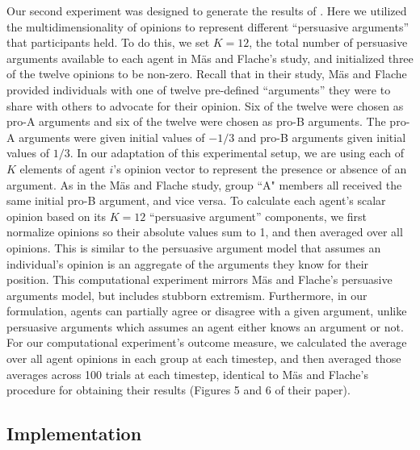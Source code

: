Our second experiment was designed to 
generate the results of . Here we utilized the multidimensionality of 
opinions to represent different ``persuasive arguments'' that participants held.
To do this, we set $K=12$, the total number of persuasive arguments available
to each agent in M\"{a}s and Flache's study, and initialized three of the twelve
opinions to be non-zero.  Recall that in their study, M\"{a}s and Flache provided
individuals with one of twelve pre-defined ``arguments'' they were to share with 
others to advocate for their opinion. Six of the twelve were chosen as pro-A arguments 
and six of the twelve were chosen as pro-B arguments. The pro-A arguments
were given initial values of $-1/3$ and pro-B arguments given initial
values of $1/3$. In our adaptation of this experimental setup, we are using
each of $K$ elements of agent $i$'s opinion vector to represent the presence
or absence of an argument. 
As in the M\"{a}s and Flache study, group ``A" members all received
the same initial pro-B argument, and vice versa. 
To calculate each agent's scalar opinion based on its $K=12$
``persuasive argument'' components, we first normalize opinions so their absolute
values sum to 1, and then averaged over all opinions. This is similar to the
persuasive argument model that assumes an individual's opinion is an aggregate
of the arguments they know for their position. 
This computational experiment mirrors M\"{a}s and Flache's persuasive arguments model, 
but includes stubborn extremism. Furthermore, in our formulation, agents can 
partially agree or disagree
with a given argument, unlike persuasive arguments which assumes an agent either
knows an argument or not.
For our computational experiment's outcome measure, we calculated the 
average over all agent opinions in each group at each timestep, and then
averaged those averages across 100 trials at each timestep, identical to
M\"{a}s and Flache's procedure for obtaining their results (Figures 5 and 6 of their paper).

\subsection{Implementation}

